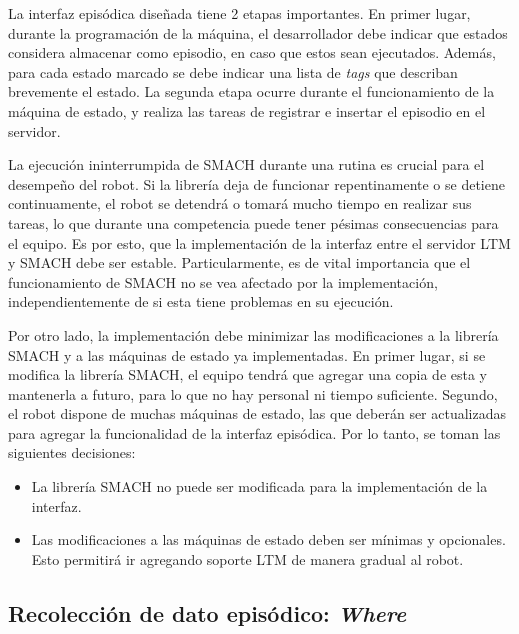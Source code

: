 La interfaz episódica diseñada tiene 2 etapas importantes. En primer lugar, durante la programación de la máquina, el desarrollador debe indicar que estados considera almacenar como episodio, en caso que estos sean ejecutados. Además, para cada estado marcado se debe indicar una lista de \textit{tags} que describan brevemente el estado. La segunda etapa ocurre durante el funcionamiento de la máquina de estado, y realiza las tareas de registrar e insertar el episodio en el servidor.

La ejecución ininterrumpida de SMACH durante una rutina es crucial para el desempeño del robot. Si la librería deja de funcionar repentinamente o se detiene continuamente, el robot se detendrá o tomará mucho tiempo en realizar sus tareas, lo que durante una competencia puede tener pésimas consecuencias para el equipo. Es por esto, que la implementación de la interfaz entre el servidor LTM y SMACH debe ser estable. Particularmente, es de vital importancia que el funcionamiento de SMACH no se vea afectado por la implementación, independientemente de si esta tiene problemas en su ejecución. 

Por otro lado, la implementación debe minimizar las modificaciones a la librería SMACH y a las máquinas de estado ya implementadas. En primer lugar, si se modifica la librería SMACH, el equipo tendrá que agregar una copia de esta y mantenerla a futuro, para lo que no hay personal ni tiempo suficiente. Segundo, el robot dispone de muchas máquinas de estado, las que deberán ser actualizadas para agregar la funcionalidad de la interfaz episódica. Por lo tanto, se toman las siguientes decisiones:
\begin{itemize}
\item La librería SMACH no puede ser modificada para la implementación de la interfaz.
\item Las modificaciones a las máquinas de estado deben ser mínimas y opcionales. Esto permitirá ir agregando soporte LTM de manera gradual al robot.
\end{itemize}


\subsection{Recolección de dato episódico: \textit{Where}}


